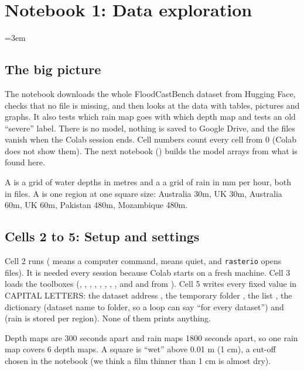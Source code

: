 \section{Notebook 1: Data exploration}\label{ch:nb-explore}
\begingroup\emergencystretch=3em

\subsection{The big picture}
The notebook downloads the whole FloodCastBench dataset from Hugging Face, checks that no file is missing, and then looks at the data with tables, pictures and graphs. It also tests which rain map goes with which depth map and tests an old ``severe'' label. There is no model, nothing is saved to Google Drive, and the files vanish when the Colab session ends. Cell numbers count every cell from 0 (Colab does not show them). The next notebook () builds the model arrays from what is found here.

A  is a grid of water depths in metres and a  a grid of rain in mm per hour, both in  files. A  is one region at one square size: Australia 30m, UK 30m, Australia 60m, UK 60m, Pakistan 480m, Mozambique 480m.

\subsection{Cells 2 to 5: Setup and settings}
Cell 2 runs  (\cd{!} means a computer command,  means quiet, and \texttt{rasterio} opens  files). It is needed every session because Colab starts on a fresh machine. Cell 3 loads the toolboxes (, , , , , , , , and  and  from ). Cell 5 writes every fixed value in CAPITAL LETTERS: the dataset address , the temporary folder , the list , the dictionary  (dataset name to folder, so a loop can say ``for every dataset'') and  (rain is stored per region). None of them prints anything.

Depth maps are 300 seconds apart and rain maps 1800 seconds apart, so one rain map covers 6 depth maps. A square is ``wet'' above 0.01 m (1 cm), a cut-off chosen in the notebook (we think a film thinner than 1 cm is almost dry).

